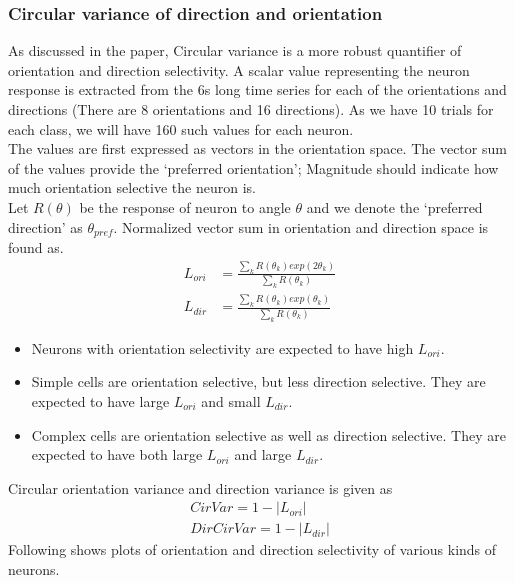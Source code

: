 \documentclass[11pt]{article}
\begin{document}
\subsubsection{Circular variance of direction and orientation} %
\label{ssub:circular_variance_of_direction_and_orientation}
As discussed in the paper, Circular variance is a more robust quantifier of orientation and direction selectivity. A scalar value representing the neuron response is extracted from the 6s long time series for each of the orientations and directions (There are 8 orientations and 16 directions). As we have 10 trials for each class, we will have 160 such values for each neuron.\\
The values are first expressed as vectors in the orientation space. The vector sum of the values provide the `preferred orientation'; Magnitude should indicate how much orientation selective the neuron is.\\
Let $R(\theta)$ be the response of neuron to angle $\theta$ and we denote the `preferred direction' as $\theta_{pref}$.
Normalized vector sum in orientation and direction space is found as.
\begin{align}
    L_{ori} &= \frac{\sum_{k} R(\theta_k) exp(2\theta_k)}{\sum_{k} R(\theta_k)}\\
    L_{dir} &= \frac{\sum_{k} R(\theta_k) exp(\theta_k)}{\sum_{k} R(\theta_k)}
\end{align}
\begin{itemize}
    \item Neurons with orientation selectivity are expected to have high $L_{ori}$.
    \item Simple cells are orientation selective, but less direction selective. They are expected to have large $L_{ori}$ and small $L_{dir}$.
    \item Complex cells are orientation selective as well as direction selective. They are expected to have both large $L_{ori}$ and large $L_{dir}$.
\end{itemize}
Circular orientation variance and direction variance is given as
\begin{align}
    CirVar = 1 - |L_{ori}|\\
    DirCirVar = 1- |L_{dir}|
\end{align}
Following shows plots of orientation and direction selectivity of various kinds of neurons.
\end{document}
